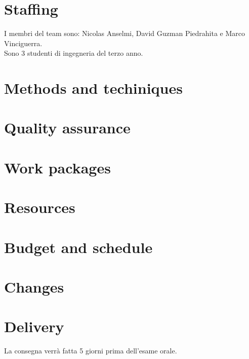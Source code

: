 \documentclass{article}
\begin{document}
\section{Staffing}
I membri del team sono: Nicolas Anselmi, David Guzman Piedrahita e Marco Vinciguerra.
\\Sono 3 studenti di ingegneria del terzo anno.

\section{Methods and techiniques}

\section{Quality assurance}

\section{Work packages}


\section{Resources}

\section{Budget and schedule}

\section{Changes}

\section{Delivery}
La consegna verrà fatta 5 giorni prima dell'esame orale.
\end{document}
